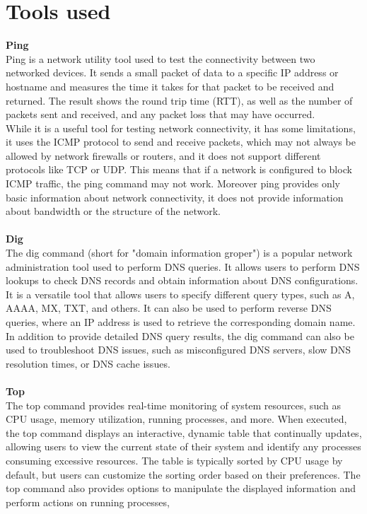 \section{Tools used}
\textbf{Ping} \\
Ping is a network utility tool used to test the connectivity between two networked devices.
It sends a small packet of data to a specific IP address or hostname and measures the time it takes for that packet to be received and returned.
The result shows the round trip time (RTT), as well as the number of packets sent and received, and any packet loss that may have occurred.\\
While it is a useful tool for testing network connectivity, it has some limitations,
it uses the ICMP protocol to send and receive packets, which may not always be allowed by network firewalls or routers, and it does not support different protocols like TCP or UDP.
This means that if a network is configured to block ICMP traffic, the ping command may not work.
Moreover ping provides only basic information about network connectivity, it does not provide information about bandwidth or the structure of the network.\\
\\
\textbf{Dig} \\
The dig command (short for "domain information groper") is a popular network administration tool used to perform DNS queries.
It allows users to perform DNS lookups to check DNS records and obtain information about DNS configurations.
It is a versatile tool that allows users to specify different query types, such as A, AAAA, MX, TXT, and others.
It can also be used to perform reverse DNS queries, where an IP address is used to retrieve the corresponding domain name.
In addition to provide detailed DNS query results, the dig command can also be used to troubleshoot DNS issues, such as misconfigured DNS servers,
slow DNS resolution times, or DNS cache issues.\\
\\
\textbf{Top} \\
The top command provides real-time monitoring of system resources, such as CPU usage, memory utilization, running processes, and more.
When executed, the top command displays an interactive, dynamic table that continually updates, allowing users to view
the current state of their system and identify any processes consuming excessive resources.
The table is typically sorted by CPU usage by default, but users can customize the sorting order based on their preferences.
The top command also provides options to manipulate the displayed information and perform actions on running processes,
